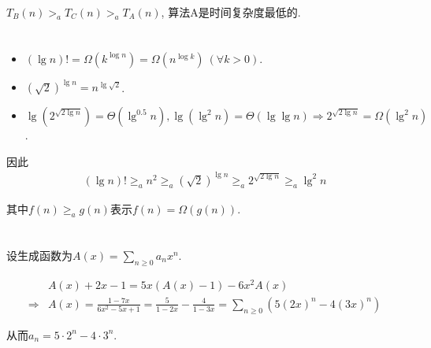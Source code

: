 \documentclass[8pt]{article}
\def\ge{\geqslant}
\begin{document}
$T_B(n) >_a T_C(n) >_a T_A(n)$, 算法A是时间复杂度最低的.
\fi

\section{}
\begin{itemize}
	\item $(\lg n)! = \Omega(k^{\log n}) = \Omega(n^{\log k})\ (\forall k > 0)$.
	\item $(\sqrt 2)^{\lg n} = n^{\lg \sqrt 2}$.
	\item $\lg (2^{\sqrt{2\lg n}}) = \Theta(\lg^{0.5}n), \lg(\lg^2n) = \Theta(\lg\lg n) \Rightarrow 2^{\sqrt{2\lg n}} =  \Omega(\lg^2n) $.
\end{itemize}

因此
\begin{align*}
	(\lg n)! \ge_a n^2 \ge_a (\sqrt 2)^{\lg n} \ge_a 2^{\sqrt{2\lg n}} \ge_a \lg^2n 
\end{align*}

其中$f(n) \ge_a g(n)$表示$f(n) = \Omega(g(n))$.

\section{}

设生成函数为$A(x) = \sum\limits_{n \ge 0}a_nx^n$. 

\begin{align*}
	& A(x) + 2x - 1 = 5x(A(x) - 1) - 6x^2A(x) \\ \Rightarrow & A(x) = \frac{1-7x}{6x^2-5x+1} = \frac{5}{1-2x} - \frac{4}{1-3x} = \sum_{n \ge 0}\left(5(2x)^n - 4(3x)^n\right)
\end{align*}

从而$a_n = 5 \cdot 2^n - 4 \cdot 3^n$.
\end{document}
